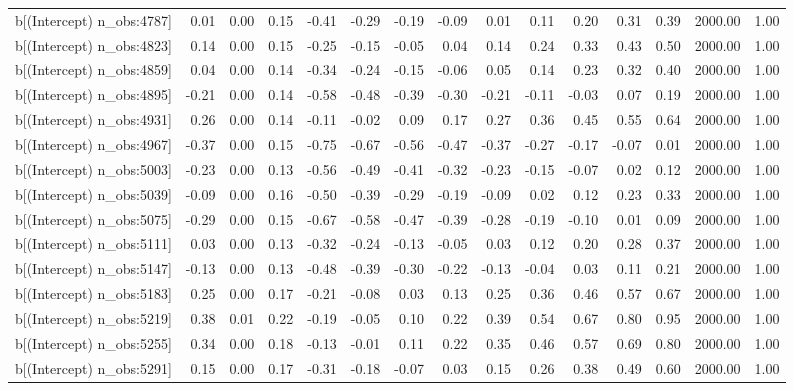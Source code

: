 \begin{table}[ht]
\begin{tabular}{rrrrrrrrrrrrrrr}
  b[(Intercept) n\_obs:4787] & 0.01 & 0.00 & 0.15 & -0.41 & -0.29 & -0.19 & -0.09 & 0.01 & 0.11 & 0.20 & 0.31 & 0.39 & 2000.00 & 1.00 \\ 
  b[(Intercept) n\_obs:4823] & 0.14 & 0.00 & 0.15 & -0.25 & -0.15 & -0.05 & 0.04 & 0.14 & 0.24 & 0.33 & 0.43 & 0.50 & 2000.00 & 1.00 \\ 
  b[(Intercept) n\_obs:4859] & 0.04 & 0.00 & 0.14 & -0.34 & -0.24 & -0.15 & -0.06 & 0.05 & 0.14 & 0.23 & 0.32 & 0.40 & 2000.00 & 1.00 \\ 
  b[(Intercept) n\_obs:4895] & -0.21 & 0.00 & 0.14 & -0.58 & -0.48 & -0.39 & -0.30 & -0.21 & -0.11 & -0.03 & 0.07 & 0.19 & 2000.00 & 1.00 \\ 
  b[(Intercept) n\_obs:4931] & 0.26 & 0.00 & 0.14 & -0.11 & -0.02 & 0.09 & 0.17 & 0.27 & 0.36 & 0.45 & 0.55 & 0.64 & 2000.00 & 1.00 \\ 
  b[(Intercept) n\_obs:4967] & -0.37 & 0.00 & 0.15 & -0.75 & -0.67 & -0.56 & -0.47 & -0.37 & -0.27 & -0.17 & -0.07 & 0.01 & 2000.00 & 1.00 \\ 
  b[(Intercept) n\_obs:5003] & -0.23 & 0.00 & 0.13 & -0.56 & -0.49 & -0.41 & -0.32 & -0.23 & -0.15 & -0.07 & 0.02 & 0.12 & 2000.00 & 1.00 \\ 
  b[(Intercept) n\_obs:5039] & -0.09 & 0.00 & 0.16 & -0.50 & -0.39 & -0.29 & -0.19 & -0.09 & 0.02 & 0.12 & 0.23 & 0.33 & 2000.00 & 1.00 \\ 
  b[(Intercept) n\_obs:5075] & -0.29 & 0.00 & 0.15 & -0.67 & -0.58 & -0.47 & -0.39 & -0.28 & -0.19 & -0.10 & 0.01 & 0.09 & 2000.00 & 1.00 \\ 
  b[(Intercept) n\_obs:5111] & 0.03 & 0.00 & 0.13 & -0.32 & -0.24 & -0.13 & -0.05 & 0.03 & 0.12 & 0.20 & 0.28 & 0.37 & 2000.00 & 1.00 \\ 
  b[(Intercept) n\_obs:5147] & -0.13 & 0.00 & 0.13 & -0.48 & -0.39 & -0.30 & -0.22 & -0.13 & -0.04 & 0.03 & 0.11 & 0.21 & 2000.00 & 1.00 \\ 
  b[(Intercept) n\_obs:5183] & 0.25 & 0.00 & 0.17 & -0.21 & -0.08 & 0.03 & 0.13 & 0.25 & 0.36 & 0.46 & 0.57 & 0.67 & 2000.00 & 1.00 \\ 
  b[(Intercept) n\_obs:5219] & 0.38 & 0.01 & 0.22 & -0.19 & -0.05 & 0.10 & 0.22 & 0.39 & 0.54 & 0.67 & 0.80 & 0.95 & 2000.00 & 1.00 \\ 
  b[(Intercept) n\_obs:5255] & 0.34 & 0.00 & 0.18 & -0.13 & -0.01 & 0.11 & 0.22 & 0.35 & 0.46 & 0.57 & 0.69 & 0.80 & 2000.00 & 1.00 \\ 
  b[(Intercept) n\_obs:5291] & 0.15 & 0.00 & 0.17 & -0.31 & -0.18 & -0.07 & 0.03 & 0.15 & 0.26 & 0.38 & 0.49 & 0.60 & 2000.00 & 1.00 \\ 

\end{tabular}
\end{table}
